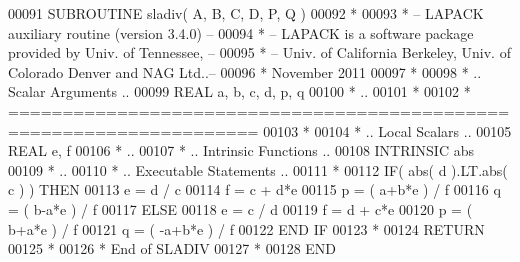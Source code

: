 \begin{DoxyCode}
00091 \textcolor{keyword}{      SUBROUTINE }sladiv( A, B, C, D, P, Q )
00092 \textcolor{comment}{*}
00093 \textcolor{comment}{*  -- LAPACK auxiliary routine (version 3.4.0) --}
00094 \textcolor{comment}{*  -- LAPACK is a software package provided by Univ. of Tennessee,    --}
00095 \textcolor{comment}{*  -- Univ. of California Berkeley, Univ. of Colorado Denver and NAG Ltd..--}
00096 \textcolor{comment}{*     November 2011}
00097 \textcolor{comment}{*}
00098 \textcolor{comment}{*     .. Scalar Arguments ..}
00099       \textcolor{keywordtype}{REAL}               a, b, c, d, p, q
00100 \textcolor{comment}{*     ..}
00101 \textcolor{comment}{*}
00102 \textcolor{comment}{*  =====================================================================}
00103 \textcolor{comment}{*}
00104 \textcolor{comment}{*     .. Local Scalars ..}
00105       \textcolor{keywordtype}{REAL}               e, f
00106 \textcolor{comment}{*     ..}
00107 \textcolor{comment}{*     .. Intrinsic Functions ..}
00108       \textcolor{keywordtype}{INTRINSIC}          abs
00109 \textcolor{comment}{*     ..}
00110 \textcolor{comment}{*     .. Executable Statements ..}
00111 \textcolor{comment}{*}
00112       \textcolor{keywordflow}{IF}( abs( d ).LT.abs( c ) ) \textcolor{keywordflow}{THEN}
00113          e = d / c
00114          f = c + d*e
00115          p = ( a+b*e ) / f
00116          q = ( b-a*e ) / f
00117       \textcolor{keywordflow}{ELSE}
00118          e = c / d
00119          f = d + c*e
00120          p = ( b+a*e ) / f
00121          q = ( -a+b*e ) / f
00122 \textcolor{keywordflow}{      END IF}
00123 \textcolor{comment}{*}
00124       \textcolor{keywordflow}{RETURN}
00125 \textcolor{comment}{*}
00126 \textcolor{comment}{*     End of SLADIV}
00127 \textcolor{comment}{*}
00128 \textcolor{keyword}{      END}
\end{DoxyCode}
